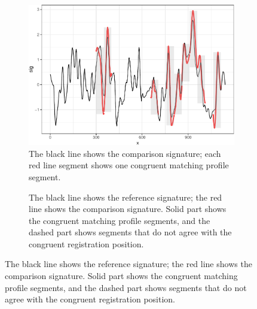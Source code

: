 \begin{figure}[hbt]
\begin{subfigure}[t]{\textwidth}
\caption{\label{fig:sigplot}The black line shows the comparison signature; each red line segment shows one congruent matching profile segment.}
\vspace{1em}
\begin{adjustbox}{valign=t}
\begin{minipage}{.39\textwidth}

{\small {}
\begin{Schunk}
\end{Schunk}
}
\vspace{1em}
\end{minipage}
\begin{minipage}{.59\textwidth}
\includegraphics[width=\textwidth]{ju-hofmann_files/figure-latex/sigplot-1.pdf}
\end{minipage}
\end{adjustbox}
\end{subfigure}
\begin{subfigure}[t]{\textwidth}
\caption{\label{fig:sigplot2}The black line shows the reference signature; the red line shows the comparison signature. Solid part shows the congruent matching profile segments, and the dashed part shows segments that do not agree with the congruent registration position.}
\vspace{1em}
\begin{adjustbox}{valign=t}
\begin{minipage}{.39\textwidth}


\end{minipage}
\end{adjustbox}
\end{subfigure}
\end{figure}
